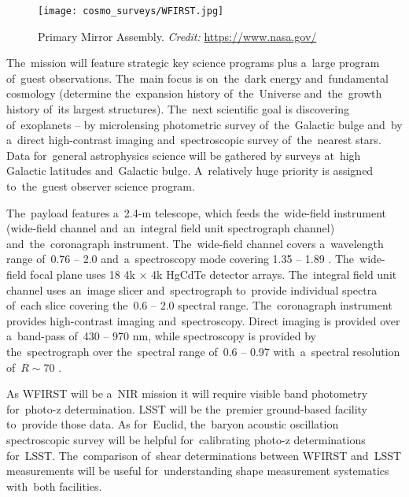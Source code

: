 \begin{figure}[htb]
    \centering
    \texttt{[image: cosmo\_surveys/WFIRST.jpg]}
    \caption{Primary Mirror Assembly. \textit{Credit:} \url{https://www.nasa.gov/}}
    \label{fig:wfirst}
\end{figure}
The~mission will feature strategic key science programs plus a~large program of~guest observations. The~main focus is on~the~dark energy and~fundamental cosmology (determine the~expansion history of~the~Universe and~the~growth history of~its largest structures). The~next scientific goal is discovering of~exoplanets -- by microlensing photometric survey of~the~Galactic bulge and~by a~direct high-contrast imaging and~spectroscopic survey of~the~nearest stars. Data for~general astrophysics science will be gathered by surveys at~high Galactic latitudes and~Galactic bulge. A~relatively huge priority is assigned to~the~guest observer science program.

The~payload features a~2.4-m telescope, which feeds the~wide-field instrument (wide-field channel and~an~integral field unit spectrograph channel) and~the~coronagraph instrument. The~wide-field channel covers a~wavelength range of~0.76 -- 2.0 \um and~a~spectroscopy mode covering 1.35 -- 1.89 \um. The~wide-field focal plane uses 18 4k $\times$ 4k HgCdTe detector arrays. The~integral field unit channel uses an~image slicer and~spectrograph to~provide individual spectra of~each slice covering the~0.6 -- 2.0 \um spectral range. The~coronagraph instrument provides high-contrast imaging and~spectroscopy. Direct imaging is provided over a~band-pass of~430 -- 970 nm, while spectroscopy is provided by the~spectrograph over the~spectral range of~0.6 -- 0.97 \um with~a~spectral resolution of~$R\sim70$ \cite{WFIRST_report}.

As WFIRST will be a~NIR mission it will require visible band photometry for~photo-z determination. LSST will be the~premier ground-based facility to~provide those data. As for~Euclid, the~baryon acoustic oscillation spectroscopic survey will be helpful for~calibrating photo-z determinations for~LSST. The~comparison of~shear determinations between WFIRST and~LSST measurements will be useful for~understanding shape measurement systematics with~both facilities.
